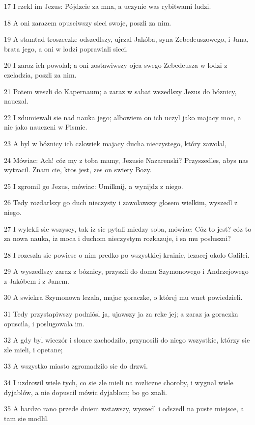 \par 17 I rzekl im Jezus: Pójdzcie za mna, a uczynie was rybitwami ludzi.
\par 18 A oni zarazem opusciwszy sieci swoje, poszli za nim.
\par 19 A stamtad troszeczke odszedlszy, ujrzal Jakóba, syna Zebedeuszowego, i Jana, brata jego, a oni w lodzi poprawiali sieci.
\par 20 I zaraz ich powolal; a oni zostawiwszy ojca swego Zebedeusza w lodzi z czeladzia, poszli za nim.
\par 21 Potem weszli do Kapernaum; a zaraz w sabat wszedlszy Jezus do bóznicy, nauczal.
\par 22 I zdumiewali sie nad nauka jego; albowiem on ich uczyl jako majacy moc, a nie jako nauczeni w Pismie.
\par 23 A byl w bóznicy ich czlowiek majacy ducha nieczystego, który zawolal,
\par 24 Mówiac: Ach! cóz my z toba mamy, Jezusie Nazarenski? Przyszedles, abys nas wytracil. Znam cie, ktos jest, zes on swiety Bozy.
\par 25 I zgromil go Jezus, mówiac: Umilknij, a wynijdz z niego.
\par 26 Tedy rozdarlszy go duch nieczysty i zawolawszy glosem wielkim, wyszedl z niego.
\par 27 I wylekli sie wszyscy, tak iz sie pytali miedzy soba, mówiac: Cóz to jest? cóz to za nowa nauka, iz moca i duchom nieczystym rozkazuje, i sa mu posluszni?
\par 28 I rozeszla sie powiesc o nim predko po wszystkiej krainie, lezacej okolo Galilei.
\par 29 A wyszedlszy zaraz z bóznicy, przyszli do domu Szymonowego i Andrzejowego z Jakóbem i z Janem.
\par 30 A swiekra Szymonowa lezala, majac goraczke, o której mu wnet powiedzieli.
\par 31 Tedy przystapiwszy podniósl ja, ujawszy ja za reke jej; a zaraz ja goraczka opuscila, i poslugowala im.
\par 32 A gdy byl wieczór i slonce zachodzilo, przynosili do niego wszystkie, którzy sie zle mieli, i opetane;
\par 33 A wszystko miasto zgromadzilo sie do drzwi.
\par 34 I uzdrowil wiele tych, co sie zle mieli na rozliczne choroby, i wygnal wiele dyjablów, a nie dopuscil mówic dyjablom; bo go znali.
\par 35 A bardzo rano przede dniem wstawszy, wyszedl i odszedl na puste miejsce, a tam sie modlil.
